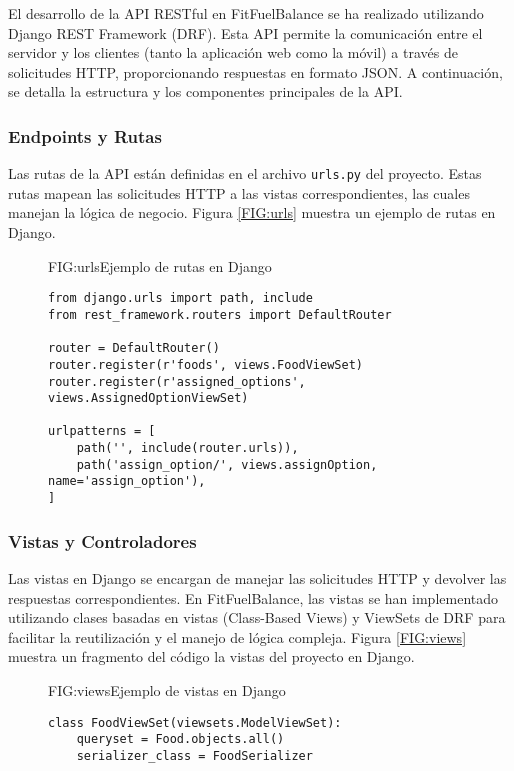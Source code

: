El desarrollo de la API RESTful en FitFuelBalance se ha realizado utilizando Django REST Framework (DRF). Esta API permite la comunicación entre el servidor y los clientes (tanto la aplicación web como la móvil) a través de solicitudes HTTP, proporcionando respuestas en formato JSON. A continuación, se detalla la estructura y los componentes principales de la API.

\subsubsection{Endpoints y Rutas}
Las rutas de la API están definidas en el archivo \texttt{urls.py} del proyecto. Estas rutas mapean las solicitudes HTTP a las vistas correspondientes, las cuales manejan la lógica de negocio. Figura \ref{FIG:urls} muestra un ejemplo de rutas en Django.

\begin{figure}[Ejemplo Código Urls]{FIG:urls}{Ejemplo de rutas en Django}
\begin{verbatim}
from django.urls import path, include
from rest_framework.routers import DefaultRouter

router = DefaultRouter()
router.register(r'foods', views.FoodViewSet)
router.register(r'assigned_options', views.AssignedOptionViewSet)

urlpatterns = [
    path('', include(router.urls)),
    path('assign_option/', views.assignOption, name='assign_option'),
]
\end{verbatim}
\end{figure}

\subsubsection{Vistas y Controladores}
Las vistas en Django se encargan de manejar las solicitudes HTTP y devolver las respuestas correspondientes. En FitFuelBalance, las vistas se han implementado utilizando clases basadas en vistas (Class-Based Views) y ViewSets de DRF para facilitar la reutilización y el manejo de lógica compleja. Figura \ref{FIG:views} muestra un fragmento del código la vistas del proyecto en Django.

\begin{figure}[Ejemplo Código Vistas]{FIG:views}{Ejemplo de vistas en Django}

\begin{verbatim}
class FoodViewSet(viewsets.ModelViewSet):
    queryset = Food.objects.all()
    serializer_class = FoodSerializer
\end{verbatim}
\end{figure}

